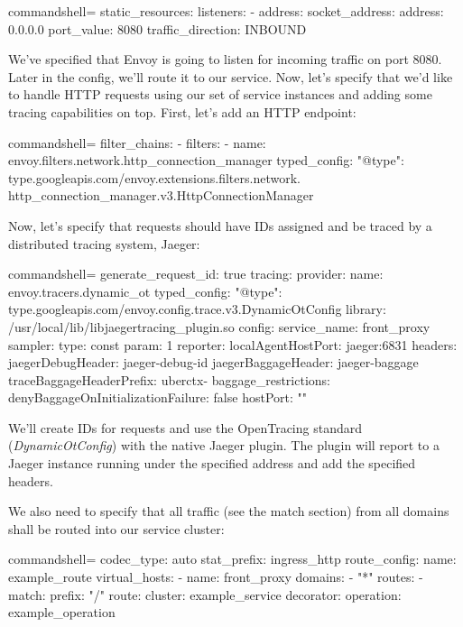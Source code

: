 \begin{tcblisting}{commandshell={}}
static_resources:
  listeners:
    - address:
      socket_address:
        address: 0.0.0.0
        port_value: 8080
      traffic_direction: INBOUND
\end{tcblisting}

We've specified that Envoy is going to listen for incoming traffic on port 8080. Later in the config, we'll route it to our service. Now, let's specify that we'd like to handle HTTP requests using our set of service instances and adding some tracing capabilities on top. First, let's add an HTTP endpoint:


\begin{tcblisting}{commandshell={}}
filter_chains:
  - filters:
  - name: envoy.filters.network.http_connection_manager
    typed_config:
      "@type":
type.googleapis.com/envoy.extensions.filters.network.
http_connection_manager.v3.HttpConnectionManager
\end{tcblisting}

Now, let's specify that requests should have IDs assigned and be traced by a distributed tracing system, Jaeger:

\begin{tcblisting}{commandshell={}}
generate_request_id: true
tracing:
  provider:
    name: envoy.tracers.dynamic_ot
    typed_config:
      "@type":
type.googleapis.com/envoy.config.trace.v3.DynamicOtConfig
     library: /usr/local/lib/libjaegertracing_plugin.so
     config:
       service_name: front_proxy
       sampler:
         type: const
         param: 1
       reporter:
         localAgentHostPort: jaeger:6831
       headers:
         jaegerDebugHeader: jaeger-debug-id
         jaegerBaggageHeader: jaeger-baggage
         traceBaggageHeaderPrefix: uberctx-
       baggage_restrictions:
         denyBaggageOnInitializationFailure: false
         hostPort: ""
\end{tcblisting}

We'll create IDs for requests and use the OpenTracing standard (\textit{DynamicOtConfig}) with the native Jaeger plugin. The plugin will report to a Jaeger instance running under the specified address and add the specified headers.

We also need to specify that all traffic (see the match section) from all domains shall be routed into our service cluster:


\begin{tcblisting}{commandshell={}}
codec_type: auto
stat_prefix: ingress_http
route_config:
  name: example_route
  virtual_hosts:
    - name: front_proxy
      domains:
        - "*"
      routes:
        - match:
            prefix: "/"
          route:
            cluster: example_service
          decorator:
            operation: example_operation
\end{tcblisting}

